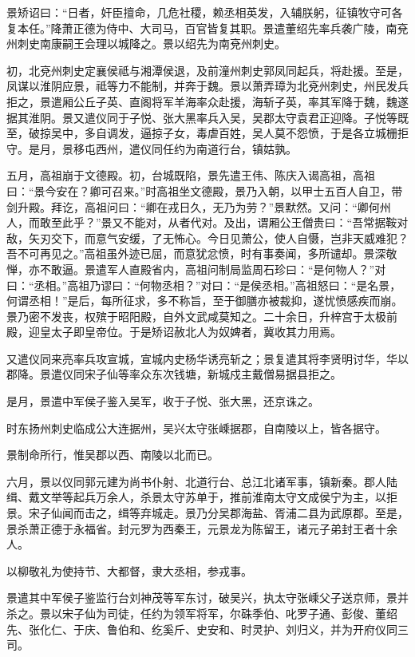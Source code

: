 \documentclass[12pt,UTF8]{ctexbook}
\begin{document}
景矫诏曰：“日者，奸臣擅命，几危社稷，赖丞相英发，入辅朕躬，征镇牧守可各复本任。”降萧正德为侍中、大司马，百官皆复其职。景遣董绍先率兵袭广陵，南兗州刺史南康嗣王会理以城降之。景以绍先为南兗州刺史。

初，北兗州刺史定襄侯祗与湘潭侯退，及前潼州刺史郭凤同起兵，将赴援。至是，凤谋以淮阴应景，祗等力不能制，并奔于魏。景以萧弄璋为北兗州刺史，州民发兵拒之，景遣厢公丘子英、直阁将军羊海率众赴援，海斩子英，率其军降于魏，魏遂据其淮阴。景又遣仪同于子悦、张大黑率兵入吴，吴郡太守袁君正迎降。子悦等既至，破掠吴中，多自调发，逼掠子女，毒虐百姓，吴人莫不怨愤，于是各立城栅拒守。是月，景移屯西州，遣仪同任约为南道行台，镇姑孰。

五月，高祖崩于文德殿。初，台城既陷，景先遣王伟、陈庆入谒高祖，高祖曰：“景今安在？卿可召来。”时高祖坐文德殿，景乃入朝，以甲士五百人自卫，带剑升殿。拜讫，高祖问曰：“卿在戎日久，无乃为劳？”景默然。又问：“卿何州人，而敢至此乎？”景又不能对，从者代对。及出，谓厢公王僧贵曰：“吾常据鞍对敌，矢刃交下，而意气安缓，了无怖心。今日见萧公，使人自慑，岂非天威难犯？吾不可再见之。”高祖虽外迹已屈，而意犹忿愤，时有事奏闻，多所谴却。景深敬惮，亦不敢逼。景遣军人直殿省内，高祖问制局监周石珍曰：“是何物人？”对曰：“丞相。”高祖乃谬曰：“何物丞相？”对曰：“是侯丞相。”高祖怒曰：“是名景，何谓丞相！”是后，每所征求，多不称旨，至于御膳亦被裁抑，遂忧愤感疾而崩。景乃密不发丧，权殡于昭阳殿，自外文武咸莫知之。二十余日，升梓宫于太极前殿，迎皇太子即皇帝位。于是矫诏赦北人为奴婢者，冀收其力用焉。

又遣仪同来亮率兵攻宣城，宣城内史杨华诱亮斩之；景复遣其将李贤明讨华，华以郡降。景遣仪同宋子仙等率众东次钱塘，新城戍主戴僧易据县拒之。

是月，景遣中军侯子鉴入吴军，收于子悦、张大黑，还京诛之。

时东扬州刺史临成公大连据州，吴兴太守张嵊据郡，自南陵以上，皆各据守。

景制命所行，惟吴郡以西、南陵以北而已。

六月，景以仪同郭元建为尚书仆射、北道行台、总江北诸军事，镇新秦。郡人陆缉、戴文举等起兵万余人，杀景太守苏单于，推前淮南太守文成侯宁为主，以拒景。宋子仙闻而击之，缉等弃城走。景乃分吴郡海盐、胥浦二县为武原郡。至是，景杀萧正德于永福省。封元罗为西秦王，元景龙为陈留王，诸元子弟封王者十余人。

以柳敬礼为使持节、大都督，隶大丞相，参戎事。

景遣其中军侯子鉴监行台刘神茂等军东讨，破吴兴，执太守张嵊父子送京师，景并杀之。景以宋子仙为司徒，任约为领军将军，尔硃季伯、叱罗子通、彭俊、董绍先、张化仁、于庆、鲁伯和、纥奚斤、史安和、时灵护、刘归义，并为开府仪同三司。
\end{document}
